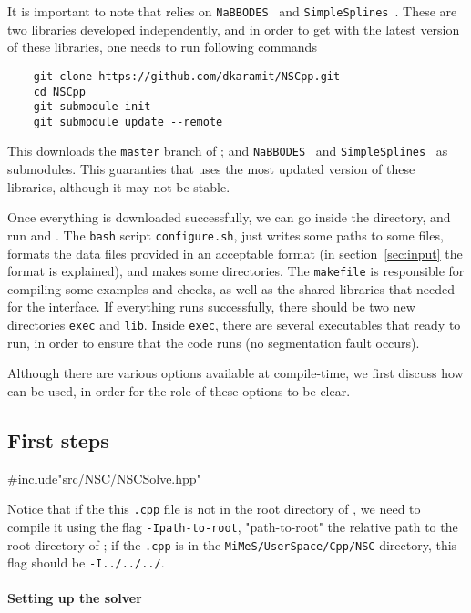 \documentclass[11pt,a4paper]{article}
\begin{document}
It is important to note that \nsc relies on {\tt NaBBODES}~\cite{NaBBODES} and {\tt SimpleSplines}~\cite{SimpleSplines}. These are two libraries developed independently, and in order to get \nsc with the latest version of these libraries, one needs to run following commands
%
\begin{lstlisting}
	git clone https://github.com/dkaramit/NSCpp.git
	cd NSCpp
	git submodule init
	git submodule update --remote
\end{lstlisting}
%
This downloads the {\tt master} branch of \nsc; and {\tt NaBBODES}~\cite{NaBBODES} and {\tt SimpleSplines}~\cite{SimpleSplines} as submodules. This guaranties that \nsc uses the most updated version of these libraries, although it may not be stable. 



Once everything is downloaded successfully, we can go inside the \nsc directory, and run  and .  The {\tt bash} script {\tt configure.sh}, just writes some paths to some files, formats the data files provided in an acceptable format (in section~\ref{sec:input} the format is explained), and makes some directories.
%
The {\tt makefile} is responsible for compiling some examples and checks, as well as the shared libraries that needed for the \PY interface.  If everything runs successfully, there should be two new directories {\tt exec} and {\tt lib}. Inside {\tt exec}, there are several executables that ready to run, in order to ensure that the code runs (\eg no segmentation fault occurs). 

Although there are various options available at compile-time, we first discuss how \nsc can be used, in order for the role of these options to be clear. 


\subsection{First steps}\label{sec:First_examples} 


\begin{cpp}
	#include"src/NSC/NSCSolve.hpp"
\end{cpp}
%
Notice that if the this {\tt .cpp} file is not in the root directory of \nsc, we need to compile it using the flag {\tt -Ipath-to-root}, "path-to-root" the relative path to the root directory of \nsc; \eg if the {\tt .cpp} is in the {\tt MiMeS/UserSpace/Cpp/NSC} directory, this flag should be {\tt -I../../../}.


\paragraph{Setting up the solver}
\end{document}
